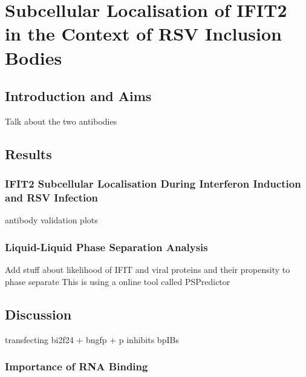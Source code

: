\chapter{Subcellular Localisation of IFIT2 in the Context of RSV Inclusion Bodies} \label{ch:Subcellular Localisation of IFIT2 in the Context of RSV Inclusion Bodies}
\section{Introduction and Aims} \label{sec:Introduction and Aims-Chapter5}
Talk about the two antibodies

\section{Results} \label{sec:Results-Chapter5}
\subsection{IFIT2 Subcellular Localisation During Interferon Induction and RSV
Infection} \label{subsec:IFIT2 Subcellular Localisation During Interferon Induction and RSV
Infection}
antibody validation plots

\lipsum[1-5]







\subsection{Liquid-Liquid Phase Separation Analysis} \label{subsec:Liquid-Liquid Phase Separation Analysis}
Add stuff about likelihood of IFIT and viral proteins and their propensity to phase separate \newline
This is using a online tool called PSPredictor


\section{Discussion} \label{sec:Discussion-Chapter5}
transfecting bi2f24 + bngfp + p inhibits bpIBs

\subsection{Importance of RNA Binding} \label{subsec:Importance of RNA Binding}
\lipsum[1-3]